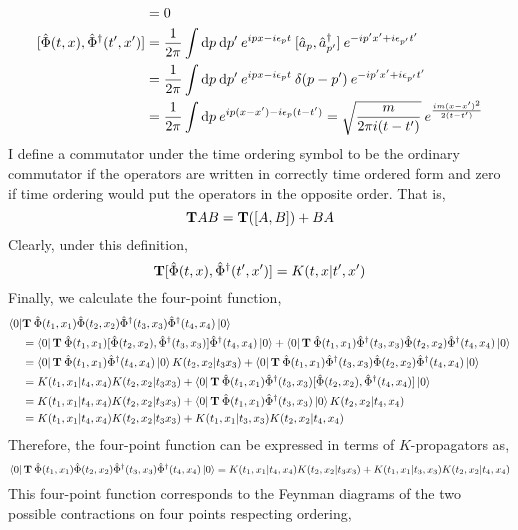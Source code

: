 \documentclass[12pt]{extarticle}
\begin{document}
\begin{align*}
[\field(t, x), \field(t', x')] & = 0 \\
[\field(t, x), \dfield(t', x')] & = \frac{1}{2 \pi} \int \d{p} \d{p'} e^{i p x - i \epsilon_p t}  \: [\a_p, \adag_{p'}] \: e^{- i p' x' + i \epsilon_{p'} t'} 
\\
& = \frac{1}{2 \pi} \int \d{p} \d{p'} e^{i p x - i \epsilon_p t}  \: \delta(p - p') \: e^{- i p' x' + i \epsilon_{p'} t'} 
\\
& = \frac{1}{2 \pi} \int \d{p} e^{i p (x - x') - i \epsilon_p (t - t')} = \sqrt{\frac{m}{2 \pi i(t - t')}} \: e^{\frac{i m (x - x')^2}{2 (t - t')}}
\end{align*}
I define a commutator under the time ordering symbol to be the ordinary commutator if the operators are written in correctly time ordered form and zero if time ordering would put the operators in the opposite order. That is,
\[ \bf{T} AB = \bf{T} ([A, B]) + BA  \]
Clearly, under this definition,
\[ \bf{T} [\field(t, x), \dfield(t', x')] = K(t, x | t', x') \]
Finally, we calculate the four-point function,
\begin{align*}
\bra{0} & \bf{T} \: \field(t_1, x_1) \field(t_2, x_2) \dfield(t_3, x_3) \dfield(t_4, x_4) \ket{0} 
\\
& = \bra{0} \bf{T} \: \field(t_1, x_1) [\field(t_2, x_2), \dfield(t_3, x_3)] \dfield(t_4, x_4) \ket{0} + \bra{0} \bf{T} \: \field(t_1, x_1) \dfield(t_3, x_3) \field(t_2, x_2) \dfield(t_4, x_4) \ket{0}
\\
& = \bra{0} \bf{T} \: \field(t_1, x_1) \dfield(t_4, x_4) \ket{0} K(t_2, x_2 | t_3 x_3) + \bra{0} \bf{T} \: \field(t_1, x_1) \dfield(t_3, x_3) \field(t_2, x_2) \dfield(t_4, x_4) \ket{0}
\\
& = K(t_1, x_1 | t_4, x_4) K(t_2, x_2 | t_3 x_3) + \bra{0} \bf{T} \: \field(t_1, x_1) \dfield(t_3, x_3) [\field(t_2, x_2), \dfield(t_4, x_4)] \ket{0}
\\
& = K(t_1, x_1 | t_4, x_4) K(t_2, x_2 | t_3 x_3) + \bra{0} \bf{T} \: \field(t_1, x_1) \dfield(t_3, x_3) \ket{0} K(t_2, x_2 | t_4, x_4)
\\
& = K(t_1, x_1 | t_4, x_4) K(t_2, x_2 | t_3 x_3) + K(t_1, x_1 | t_3, x_3) K(t_2, x_2 | t_4, x_4) 
\end{align*}
Therefore, the four-point function can be expressed in terms of $K$-propagators as,
\[\bra{0} \bf{T} \: \field(t_1, x_1) \field(t_2, x_2) \dfield(t_3, x_3) \dfield(t_4, x_4) \ket{0} = K(t_1, x_1 | t_4, x_4) K(t_2, x_2 | t_3 x_3) + K(t_1, x_1 | t_3, x_3) K(t_2, x_2 | t_4, x_4) \]
This four-point function corresponds to the Feynman diagrams of the two possible contractions on four points respecting ordering, 
\end{document}
